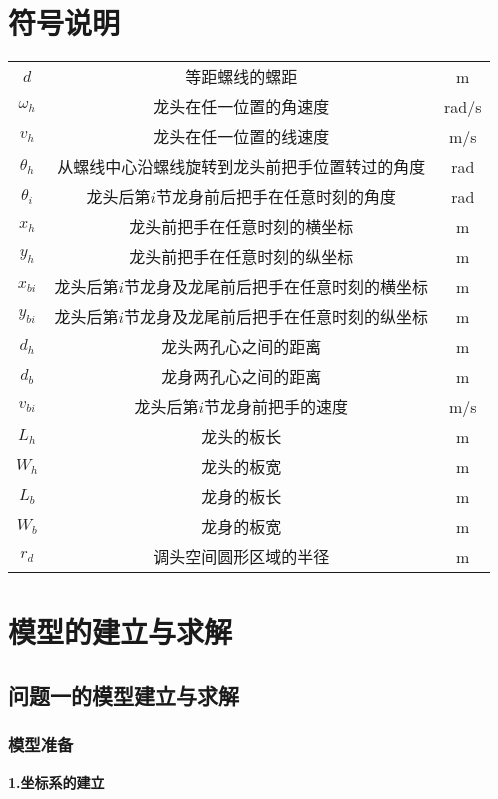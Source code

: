 \documentclass[withoutpreface,bwprint]{cumcmthesis} %
\begin{document}
	\section{符号说明}
	\begin{center}
		\setlength\extrarowheight{-2pt}
		\begin{tabular}{ccc}
			\toprule[1.5pt]
			\makebox[0.12\textwidth][c]{符号} & \makebox[0.4\textwidth][c]{意义} & \makebox[0.12\textwidth][c]{单位} \\
			\midrule[1pt]
			$ d $ & 等距螺线的螺距 & m \\
			$ \omega_h $ & 龙头在任一位置的角速度 & rad/s \\
			$ v_h $ & 龙头在任一位置的线速度 & m/s \\
			$ \theta_h $ & 从螺线中心沿螺线旋转到龙头前把手位置转过的角度 & rad \\
			$ \theta_i $ & 龙头后第$i$节龙身前后把手在任意时刻的角度 & rad \\
			$ x_h $ & 龙头前把手在任意时刻的横坐标 & m \\
			$ y_h $ & 龙头前把手在任意时刻的纵坐标 & m \\
			$ x_{bi} $ & 龙头后第$i$节龙身及龙尾前后把手在任意时刻的横坐标 & m \\
			$ y_{bi} $ & 龙头后第$i$节龙身及龙尾前后把手在任意时刻的纵坐标 & m \\
			$ d_h $ & 龙头两孔心之间的距离 & m \\
			$ d_b $ & 龙身两孔心之间的距离 & m \\
			$ v_{bi} $ & 龙头后第$i$节龙身前把手的速度 & m/s \\
			$ L_h $ & 龙头的板长 & m \\
			$ W_h $ & 龙头的板宽 & m \\
			$ L_b $ & 龙身的板长 & m \\
			$ W_b $ & 龙身的板宽 & m \\
			$ r_d $ & 调头空间圆形区域的半径 & m \\
			\bottomrule[1.5pt]
		\end{tabular}
	\end{center}
	\section{模型的建立与求解}
	
	\subsection{问题一的模型建立与求解}
	\subsubsection{模型准备}
	\textbf{1.坐标系的建立}
	
\end{document}
